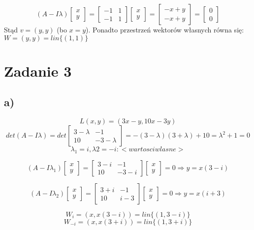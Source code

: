 \documentclass{article}
\begin{document}
$$(A-I\lambda)\left[\begin{array}{c}x\\y\end{array}\right] = \left[\begin{array}{cc}-1&1\\-1&1\end{array}\right]\left[\begin{array}{c}x\\y\end{array}\right] = \left[\begin{array}{c}-x+y\\-x+y\end{array}\right] = \left[\begin{array}{c}0\\0\end{array}\right]$$
Stąd $v = (y,y)$ (bo $x=y$). \newline Ponadto przestrzeń wektorów własnych równa się: $W = {(y,y)} = lin\{(1,1)\}$


\section{Zadanie 3}

\subsection{a)}

$$L(x,y) = (3x-y,10x-3y)$$
$$det(A-I\lambda) = det \left[\begin{array}{cc}3-\lambda&-1\\10&-3-\lambda\end{array}\right] = -(3-\lambda)(3+\lambda)+10 = \lambda^{2} + 1 = 0$$
$$\lambda_{1} = i, \lambda{2} = -i :<wartosci wlasne>$$

$$(A-I\lambda_{1})\left[\begin{array}{c}x\\y\end{array}\right] = \left[\begin{array}{cc}3-i&-1\\10&-3-i\end{array}\right]\left[\begin{array}{c}x\\y\end{array}\right] = 0 \Rightarrow y = x(3-i)$$

$$(A-I\lambda_{2})\left[\begin{array}{c}x\\y\end{array}\right] = \left[\begin{array}{cc}3+i&-1\\10&i-3\end{array}\right]\left[\begin{array}{c}x\\y\end{array}\right] = 0 \Rightarrow y = x(i+3)$$

$$W_{i} = (x,x(3-i)) = lin\{(1,3-i)\} $$
$$W_{-i} = (x,x(3+i)) = lin\{(1,3+i)\} $$
\end{document}
